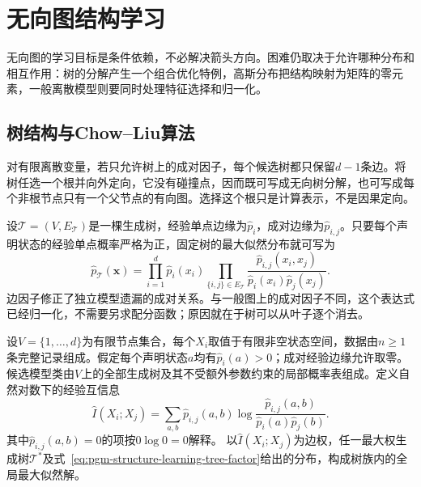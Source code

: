\section{无向图结构学习}
\label{sec:pgm-structure-learning-undirected}

无向图的学习目标是条件依赖，不必解决箭头方向。困难仍取决于允许哪种分布和相互作用：树的分解产生一个组合优化特例，高斯分布把结构映射为矩阵的零元素，一般离散模型则要同时处理特征选择和归一化。

\subsection{树结构与Chow--Liu算法}
\label{sec:pgm-structure-learning-chow-liu}

对有限离散变量，若只允许树上的成对因子，每个候选树都只保留$d-1$条边。将树任选一个根并向外定向，它没有碰撞点，因而既可写成无向树分解，也可写成每个非根节点只有一个父节点的有向图。选择这个根只是计算表示，不是因果定向。

设$\mathcal{T}=(V,E_{\mathcal{T}})$是一棵生成树，经验单点边缘为$\widehat p_i$，成对边缘为$\widehat p_{i,j}$。只要每个声明状态的经验单点概率严格为正，固定树的最大似然分布就可写为
\begin{equation}
  \widehat p_{\mathcal{T}}(\bm{x})
  =\prod_{i=1}^{d}\widehat p_i(x_i)
   \prod_{\{i,j\}\in E_{\mathcal{T}}}
     \frac{\widehat p_{i,j}(x_i,x_j)}
          {\widehat p_i(x_i)\widehat p_j(x_j)}.
  \label{eq:pgm-structure-learning-tree-factor}
\end{equation}
边因子修正了独立模型遗漏的成对关系。与一般图上的成对因子不同，这个表达式已经归一化，不需要另求配分函数；原因就在于树可以从叶子逐个消去。

\begin{theorem}
  \label{thm:pgm-structure-learning-chow-liu}
  设$V=\{1,\ldots,d\}$为有限节点集合，每个$X_i$取值于有限非空状态空间，数据由$n\geq1$条完整记录组成。假定每个声明状态$a$均有$\widehat p_i(a)>0$；成对经验边缘允许取零。候选模型类由$V$上的全部生成树及其不受额外参数约束的局部概率表组成。定义自然对数下的经验互信息
  \[
    \widehat I(X_i;X_j)
    =\sum_{a,b}\widehat p_{i,j}(a,b)
       \log\frac{\widehat p_{i,j}(a,b)}
                     {\widehat p_i(a)\widehat p_j(b)}.
  \]
  其中$\widehat p_{i,j}(a,b)=0$的项按$0\log 0=0$解释。
  以$\widehat I(X_i;X_j)$为边权，任一最大权生成树$\mathcal{T}^{*}$及式~\eqref{eq:pgm-structure-learning-tree-factor}给出的分布，构成树族内的全局最大似然解。
\end{theorem}

